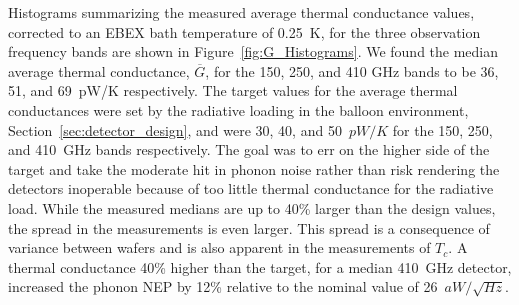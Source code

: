 

Histograms summarizing the measured average thermal conductance values, corrected to an \ac{EBEX} bath temperature of 0.25~K, for the three observation frequency bands are shown in Figure~\ref{fig:G_Histograms}.
We found the median average thermal conductance, $\overline{G}$, for the 150, 250, and 410 GHz bands to be 36, 51, and 69~pW/K respectively. 
The target values for the average thermal conductances were set by the radiative loading in the balloon environment, Section~\ref{sec:detector_design}, and were 30, 40, and 50~$pW/K$ for the 150, 250, and 410~GHz bands respectively. 
The goal was to err on the higher side of the target and take the moderate hit in phonon noise rather than risk rendering the detectors inoperable because of too little thermal conductance for the radiative load. 
While the 
measured medians are up to 40\% larger than the design values, the spread in the measurements is even larger. This spread is 
a consequence of variance between wafers and is also apparent in the measurements of $T_{c}$. 
A thermal conductance 40\% higher than the target, for a median 410~GHz detector, 
increased the phonon \ac{NEP} by 12\% relative to the nominal value of 26~$aW/\sqrt{Hz}$. 


